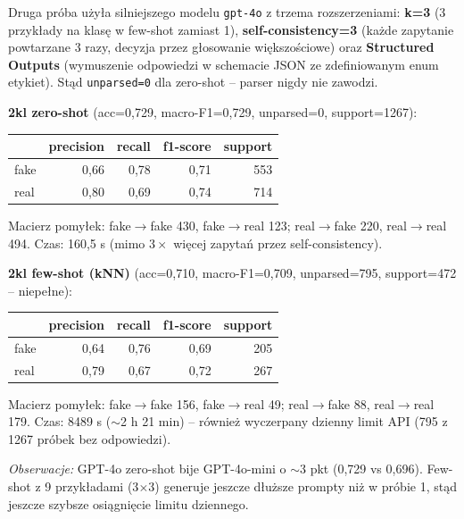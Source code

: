 \documentclass[11pt,a4paper]{article}
\begin{document}
Druga próba użyła silniejszego modelu \texttt{gpt-4o} z trzema rozszerzeniami:
\textbf{k=3} (3 przykłady na klasę w few-shot zamiast 1), \textbf{self-consistency=3}
(każde zapytanie powtarzane 3 razy, decyzja przez głosowanie większościowe)
oraz \textbf{Structured Outputs} (wymuszenie odpowiedzi w schemacie JSON
ze zdefiniowanym enum etykiet). Stąd \texttt{unparsed=0} dla zero-shot --
parser nigdy nie zawodzi.

\textbf{2kl zero-shot} (acc=0{,}729, macro-F1=0{,}729, unparsed=0, support=1267):
\begin{center}
\begin{tabular}{lrrrr}
\toprule
 & precision & recall & f1-score & support \\
\midrule
fake & 0{,}66 & 0{,}78 & 0{,}71 & 553 \\
real & 0{,}80 & 0{,}69 & 0{,}74 & 714 \\
\bottomrule
\end{tabular}
\end{center}
Macierz pomyłek: fake$\to$fake 430, fake$\to$real 123; real$\to$fake 220,
real$\to$real 494. Czas: 160{,}5 s (mimo $3\times$ więcej zapytań przez
self-consistency).

\textbf{2kl few-shot (kNN)} (acc=0{,}710, macro-F1=0{,}709, unparsed=795,
support=472 -- niepełne):
\begin{center}
\begin{tabular}{lrrrr}
\toprule
 & precision & recall & f1-score & support \\
\midrule
fake & 0{,}64 & 0{,}76 & 0{,}69 & 205 \\
real & 0{,}79 & 0{,}67 & 0{,}72 & 267 \\
\bottomrule
\end{tabular}
\end{center}
Macierz pomyłek: fake$\to$fake 156, fake$\to$real 49; real$\to$fake 88,
real$\to$real 179. Czas: 8489 s ($\sim$2 h 21 min) -- również wyczerpany
dzienny limit API (795 z 1267 próbek bez odpowiedzi).

\textit{Obserwacje:} GPT-4o zero-shot bije GPT-4o-mini o $\sim$3 pkt
(0{,}729 vs 0{,}696). Few-shot z 9 przykładami (3$\times$3) generuje
jeszcze dłuższe prompty niż w próbie 1, stąd jeszcze szybsze osiągnięcie
limitu dziennego.
\end{document}
